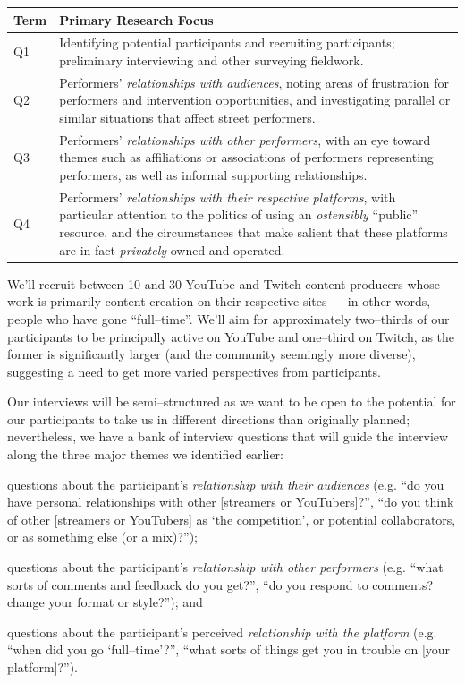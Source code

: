 \documentclass[10pt]{article}
\begin{document}
\noindent\begin{tabular}{p{.5in}|p{5.5in}}
  \textbf{Term} & \textbf{Primary Research Focus} \\
\hline
Q1  & Identifying potential participants and recruiting participants;
      preliminary interviewing and other surveying fieldwork. \\
\hline
Q2  & Performers' \textit{relationships with audiences},
      noting areas of frustration for performers and intervention opportunities, and
      investigating parallel or similar situations that affect street performers. \\
\hline
Q3  & Performers' \textit{relationships with other performers},
      with an eye toward themes such as affiliations or associations of performers representing performers,
      as well as informal supporting relationships. \\
\hline
Q4  & Performers' \textit{relationships with their respective platforms},
      with particular attention to the politics of using an \textit{ostensibly} ``public'' resource,
      and the circumstances that make salient that these platforms are in fact \textit{privately} owned and operated.
\end{tabular}

\vspace*{5pt}

We'll recruit between 10 and 30 YouTube and Twitch content producers whose work is primarily content creation on their respective sites
--- in other words, people who have gone ``full--time''.
We'll aim for approximately two--thirds of our participants to be principally active on YouTube and one--third on Twitch, as
the former is significantly larger (and the community seemingly more diverse), suggesting
a need to get more varied perspectives from participants.

Our interviews will be semi--structured as
we want to be open to the potential for our participants to take us in different directions than originally planned;
nevertheless, we have a bank of interview questions that will
guide the interview along the three major themes we identified earlier:
\begin{inlinelist}
  \item questions about the participant's \textit{relationship with their audiences}
        (e.g. ``do you have personal relationships with other [streamers or YouTubers]?'',
              ``do you think of other [streamers or YouTubers] as `the competition', or potential collaborators, or as something else (or a mix)?'');
  \item questions about the participant's \textit{relationship with other performers}
        (e.g. ``what sorts of comments and feedback do you get?'',
              ``do you respond to comments? change your format or style?''); and
  \item questions about the participant's perceived \textit{relationship with the platform}
        (e.g. ``when did you go `full--time'?'',
              ``what sorts of things get you in trouble on [your platform]?'').
\end{inlinelist}
\end{document}
